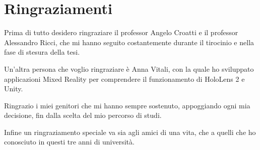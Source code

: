 \chapter*{Ringraziamenti}

Prima di tutto desidero ringraziare il professor Angelo Croatti e il professor Alessandro Ricci, che mi hanno seguito costantemente durante il tirocinio e nella fase di stesura della tesi.

Un'altra persona che voglio ringraziare è Anna Vitali, con la quale ho sviluppato applicazioni Mixed Reality per comprendere il funzionamento di HoloLens 2 e Unity.

Ringrazio i miei genitori che mi hanno sempre sostenuto, appoggiando ogni mia decisione, fin dalla scelta del mio percorso di studi.

Infine un ringraziamento speciale va sia agli amici di una vita, che a quelli che ho conosciuto in questi tre anni di università.